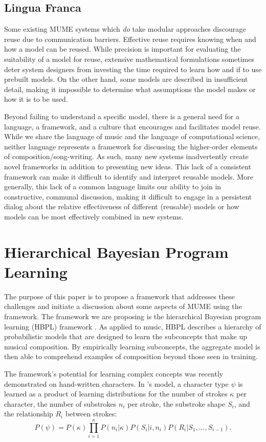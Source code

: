 \documentclass[letterpaper]{article}
\begin{document}
\subsection{Lingua Franca}

Some existing MUME systems which \emph{do} take modular approaches discourage reuse due to communication barriers. Effective reuse requires knowing when and how a model can be reused. While precision is important for evaluating the suitability of a model for reuse, extensive mathematical formulations sometimes deter system designers from investing the time required to learn how and if to use prebuilt models. On the other hand, some models are described in insufficient detail, making it impossible to determine what assumptions the model makes or how it is to be used.

Beyond failing to understand a specific model, there is a general need for a language, a framework, and a culture that encourages and facilitates model reuse. While we share the language of music and the language of computational science, neither language represents a framework for discussing the higher-order elements of composition/song-writing. As such, many new systems inadvertently create novel frameworks in addition to presenting new ideas. This lack of a consistent framework can make it difficult to identify and interpret reusable models. More generally, this lack of a common language limits our ability to join in constructive, communal discussion, making it difficult to engage in a persistent dialog about the relative effectiveness of different (reusable) models or how models can be most effectively combined in new systems.

\section{Hierarchical Bayesian Program Learning}

The purpose of this paper is to propose a framework that addresses these challenges and initiate a discussion about some aspects of MUME using the framework. The framework we are proposing is the hierarchical Bayesian program learning (HBPL) framework \cite{lake2015human}. As applied to music, HBPL describes a hierarchy of probabilistic models that are designed to learn the subconcepts that make up musical composition. By empirically learning subconcepts, the aggregate model is then able to comprehend examples of composition beyond those seen in training.

The framework's potential for learning complex concepts was recently demonstrated on hand-written characters. In \citeauthor{lake2015human}'s model, a character type $\psi$ is learned as a product of learning distributions for the number of strokes $\kappa$ per character, the number of substrokes $n_i$ per stroke, the substroke shape $S_i$, and the relationship $R_i$ between strokes:
\[ P(\psi) = P(\kappa) \prod_{i=1}^{\kappa} P(n_i|\kappa)P(S_i|i,n_i)P(R_i|S_1, ..., S_{i-1}). \]
\end{document}
